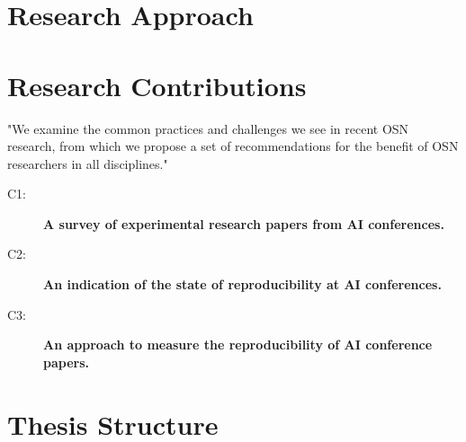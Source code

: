 \section{Research Approach}
\section{Research Contributions}

"We examine the common practices and challenges we
see  in  recent  OSN  research,  from  which  we  propose
a  set  of  recommendations  for  the  benefit  of  OSN
researchers in all disciplines."
\begin{description}
    \item[C1:] \textbf{A survey of experimental research papers from AI conferences.}
    \item[C2:] \textbf{An indication of the state of reproducibility at AI conferences.}
    \item[C3:] \textbf{An approach to measure the reproducibility of AI conference papers.}
\end{description}

\section{Thesis Structure}

\cleardoublepage
